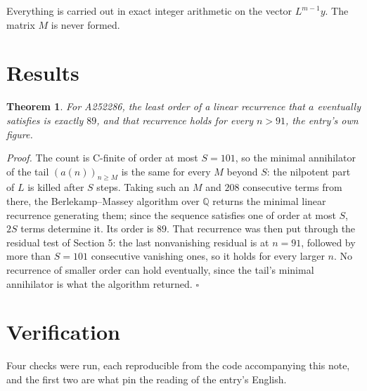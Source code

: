 \documentclass[11pt]{article}
\newtheorem{theorem}{Theorem}
\theoremstyle{definition}
\begin{document}
Everything is carried out in exact integer arithmetic on the vector $L^{m-1}y$. The matrix $M$ is never formed.

\section{Results}

\begin{theorem} For A252286, the least order of a linear recurrence that $a$ eventually satisfies is exactly $89$, and that recurrence holds for every $n > 91$, the entry's own figure.\end{theorem}

{\itshape Proof.} The count is C-finite of order at most $S = 101$, so the minimal annihilator of the tail $(a(n))_{n \ge M}$ is the same for every $M$ beyond $S$: the nilpotent part of $L$ is killed after $S$ steps. Taking such an $M$ and $208$ consecutive terms from there, the Berlekamp--Massey algorithm over $\mathbb{Q}$ returns the minimal linear recurrence generating them; since the sequence satisfies one of order at most $S$, $2S$ terms determine it. Its order is $89$. That recurrence was then put through the residual test of Section 5: the last nonvanishing residual is at $n = 91$, followed by more than $S = 101$ consecutive vanishing ones, so it holds for every larger $n$. No recurrence of smaller order can hold eventually, since the tail's minimal annihilator is what the algorithm returned. $\square$

\section{Verification}

Four checks were run, each reproducible from the code accompanying this note, and the first two are what pin the reading of the entry's English.
\end{document}
